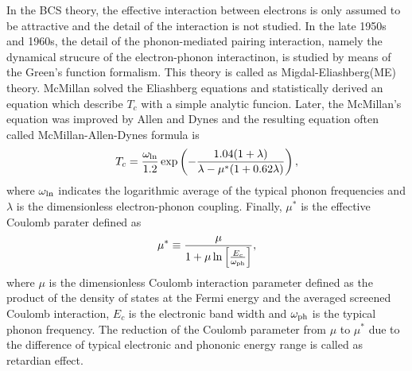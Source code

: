 In the BCS theory, the effective interaction between electrons is only assumed to be attractive and
the detail of the interaction is not studied.
In the late 1950s and 1960s, the detail of the phonon-mediated pairing interaction, namely the 
dynamical strucure of the electron-phonon interactinon, is studied by means of the Green's function 
formalism\cite{Migdal1958,Nambu1960,Eliashberg1960,Morel1962,Schrieffer1964,Scalapino1966}. 
This theory is called as Migdal-Eliashberg(ME) theory.
McMillan\cite{McMillan1968} solved the Eliashberg equations\cite{Parks1969}
and statistically derived an equation which describe $T_c$ with a simple analytic funcion. 
Later, the McMillan's equation was improved by Allen and Dynes\cite{AllenDynes} and the resulting 
equation often called McMillan-Allen-Dynes formula is
%
\begin{equation}
	T_c = \frac{\omega_{\rm ln}}{1.2} \exp \left( -\frac{1.04(1+\lambda)}
	{\lambda-\mu^{\ast}(1+0.62\lambda)} \right),
	\label{eq:Allen}
\end{equation}
%
where $\omega_{\rm ln}$ indicates the logarithmic average of the typical phonon frequencies and
$\lambda$ is the dimensionless electron-phonon coupling. Finally, $\mu^{\ast}$ is the effective Coulomb
parater defined as
%
\begin{equation}
	\mu^{\ast} \equiv \frac{\mu}{1 + \mu \ln \left[ \frac{E_c}{\omega_{\rm ph}} \right]},
	\label{eq:mustar}
\end{equation}
%
where $\mu$ is the dimensionless Coulomb interaction parameter defined as the product of the density
of states at the Fermi energy and the averaged screened Coulomb interaction, $E_c$ is the
electronic band width and $\omega_{\rm ph}$ is the typical phonon frequency.
The reduction of the Coulomb parameter from $\mu$ to $\mu^{\ast}$ due to the difference of 
typical electronic and phononic energy range is called as retardian effect\cite{Bogo1958,Morel1962}.

